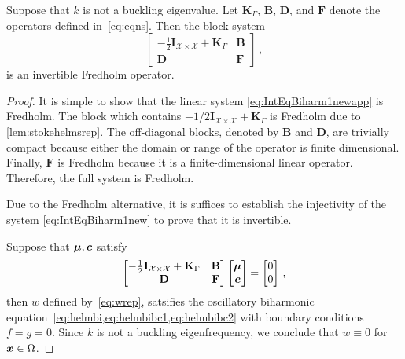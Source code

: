 \begin{lem}
Suppose that $k$ is not a buckling eigenvalue. 
Let $\mathbf{K}_{\Gamma}$, $\mathbf{B}$, $\mathbf{D}$, 
and $\mathbf{F}$ denote the operators defined in~\cref{eq:eqns}.
Then the block system
\begin{equation}
\begin{bmatrix}
-\frac{1}{2}\mathbf{I}_{\mathcal{X}\times\mathcal{X}} + 
\mathbf{K}_{\Gamma} & \mathbf{B} \\
\mathbf{D} & \mathbf{F} 
\end{bmatrix} \, ,
\label{eq:IntEqBiharm1newapp}
\end{equation}
is an invertible Fredholm operator.
\end{lem}
\begin{proof}
It is simple to
show that the linear system \cref{eq:IntEqBiharm1newapp}
is Fredholm. The block which contains
$-1/2 \mathbf{I}_{\mathcal{X}\times\mathcal{X}}
+ \mathbf{K}_\Gamma$ is Fredholm due to 
\cref{lem:stokehelmsrep}. 
The off-diagonal blocks,
denoted by $\mathbf{B}$ and $\mathbf{D}$, 
are trivially compact because either the domain 
or range of the operator is finite dimensional. 
Finally, $\mathbf{F}$ is 
Fredholm because it is a finite-dimensional linear
operator. 
Therefore, the full system is Fredholm.

Due to the Fredholm alternative,
it is suffices to establish the injectivity of
the system \cref{eq:IntEqBiharm1new} to prove that 
it is invertible.

Suppose that ${\boldsymbol \mu},{\boldsymbol c}$ satisfy
\begin{equation}
\begin{bmatrix}
-\frac{1}{2}\mathbf{I}_{\mathcal{X}\times\mathcal{X}} + 
\mathbf{K}_{\Gamma} & \mathbf{B} \\
\mathbf{D} & \mathbf{F} 
\end{bmatrix}  
\begin{bmatrix}
{\boldsymbol \mu} \\
{\boldsymbol c}
\end{bmatrix}
=
\begin{bmatrix}
0 \\ 0
\end{bmatrix} \, ,
\label{eq:IntEqBiharm1newapp2}
\end{equation}
then $w$ defined by~\cref{eq:wrep}, satsifies the oscillatory biharmonic
equation~\cref{eq:helmbi,eq:helmbibc1,eq:helmbibc2} 
with boundary conditions $f=g=0$.
Since $k$ is not a buckling eigenfrequency, we conclude that $w\equiv 0$ 
for ${\boldsymbol x} \in \Omega$.



\end{proof}
